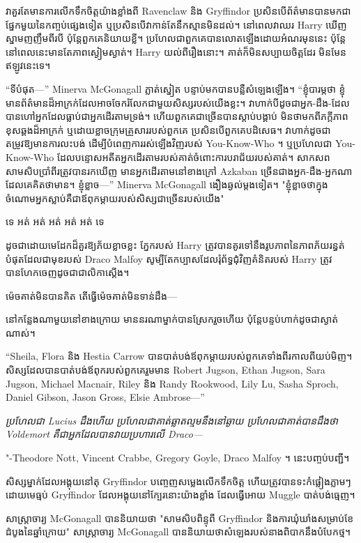 វាគួរតែមានការលើកទឹកចិត្តយ៉ាងខ្លាំងពី Ravenclaw និង Gryffindor ប្រសិនបើព័ត៌មានបានមកជាផ្នែកមួយនៃកញ្ចប់ផ្សេងទៀត ឬប្រសិនបើវាកាន់តែនឹកស្មានមិនដល់។ នៅពេលវាឈរ Harry ឃើញស្នាមញញឹមពីរបី ប៉ុន្តែពួកគេនិយាយខ្លី។ ប្រហែល​ជា​ពួក​គេ​បាន​លោត​ឡើង​ដោយ​អំណរ​មុន​នេះ ប៉ុន្តែ​នៅ​ពេល​នេះ​មាន​តែ​ភាព​ស្ងៀម​ស្ងាត់។ Harry យល់​ពី​រឿង​នោះ។ គាត់​ក៏​មិន​សប្បាយ​ចិត្ត​ដែរ មិន​មែន​ឥឡូវ​នេះ​ទេ។

“ទីបំផុត—” Minerva McGonagall ភ្លាត់ស្នៀត បន្ទាប់មកបានបន្លឺសំឡេងឡើង។ “ខ្ញុំបារម្ភថា ខ្ញុំមានព័ត៌មានដ៏អាក្រក់ដែលអាចចែករំលែកជាមួយសិស្សរបស់យើងខ្លះ។ វាហាក់បីដូចជាអ្នក-ដឹង-ដែលបានហៅអ្នកដែលធ្លាប់ជាអ្នកដើរតាមទ្រង់។ ហើយពួកគេជាច្រើនបានស្តាប់បង្គាប់ មិនថាមកពីភក្ដីភាពខុសឆ្គងដ៏អាក្រក់ ឬដោយខ្លាចក្រុមគ្រួសាររបស់ពួកគេ ប្រសិនបើពួកគេបដិសេធ។ វាហាក់ដូចជាតម្រូវឱ្យមានការលះបង់ ដើម្បីបំពេញការរស់ឡើងវិញរបស់ You-Know-Who ។ ឬប្រហែលជា You-Know-Who ដែលបន្ទោសអតីតអ្នកដើរតាមរបស់គាត់ចំពោះការបរាជ័យរបស់គាត់។ សាកសពសាមសិបប្រាំពីរត្រូវបានរកឃើញ មានអ្នកដើរតាមនៅខាងក្រៅ Azkaban ច្រើនជាងអ្នក-ដឹង-អ្នកណាដែលគេគិតថាមាន។ ខ្ញុំខ្លាច—” Minerva McGonagall ងឿងឆ្ងល់ម្តងទៀត។ "ខ្ញុំខ្លាចថាក្នុងចំណោមអ្នកស្លាប់គឺជាឪពុកម្តាយរបស់សិស្សជាច្រើនរបស់យើង"

ទេ អត់ អត់ អត់ អត់ អត់ ទេ

ដូចជាដោយមេដែកដ៏គួរឱ្យភ័យខ្លាចខ្លះ ភ្នែករបស់ Harry ត្រូវបានគូរទៅនឹងរូបភាពនៃភាពភ័យរន្ធត់បំផុតដែលជាមុខរបស់ Draco Malfoy សូម្បីតែកប្បាសដែលរុំព័ទ្ធជុំវិញគំនិតរបស់ Harry ត្រូវបានហែកចេញដូចជាជាលិកាស្តើង។

ម៉េច​គាត់​មិន​បាន​គិត តើ​ធ្វើ​ម៉េច​គាត់​មិន​ទាន់​ដឹង—

នៅកន្លែងណាមួយនៅខាងក្រោយ មាននរណាម្នាក់បានស្រែករួចហើយ ប៉ុន្តែបន្ទប់ហាក់ដូចជាស្ងាត់ណាស់។

“Sheila, Flora និង Hestia Carrow បានបាត់បង់ឪពុកម្តាយរបស់ពួកគេទាំងពីរកាលពីយប់មិញ។ សិស្សដែលបានបាត់បង់ឪពុករបស់ពួកគេរួមមាន Robert Jugson, Ethan Jugson, Sara Jugson, Michael Macnair, Riley និង Randy Rookwood, Lily Lu, Sasha Sproch, Daniel Gibson, Jason Gross, Elsie Ambrose—”

\emph{ប្រហែលជា Lucius ដឹងហើយ ប្រហែលជាគាត់ឆ្លាតល្មមនឹងនៅឆ្ងាយ ប្រហែលជាគាត់បានដឹងថា Voldemort គឺជាអ្នកដែលបានវាយប្រហារលើ Draco—}

"-Theodore Nott, Vincent Crabbe, Gregory Goyle, Draco Malfoy ។ នេះបញ្ចប់បញ្ជី។

សិស្សម្នាក់ដែលអង្គុយនៅតុ Gryffindor បញ្ចេញសម្លេងលើកទឹកចិត្ត ហើយត្រូវបានទះកំផ្លៀងភ្លាមៗដោយមេធ្មប់ Gryffindor ដែលអង្គុយនៅក្បែរនោះយ៉ាងខ្លាំង ដែលធ្វើអោយ Muggle បាត់បង់ធ្មេញ។

សាស្រ្តាចារ្យ McGonagall បាននិយាយថា "សាមសិបពិន្ទុពី Gryffindor និងការឃុំឃាំងសម្រាប់ខែដំបូងនៃឆ្នាំក្រោយ" សាស្រ្តាចារ្យ McGonagall បាននិយាយថាសំឡេងរបស់នាងពិបាកនឹងបំបែកថ្ម។

